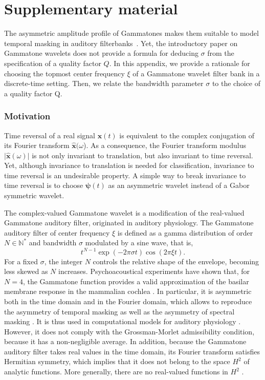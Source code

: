 \documentclass[smallextended]{svjour3}
\begin{document}
\section{Supplementary material}

The asymmetric amplitude profile of Gammatones makes them suitable to model temporal masking in auditory filterbanks~\cite{Fastl2007}.
Yet, the introductory paper on Gammatone wavelets \cite{Venkitaraman2014} does not provide a formula for deducing $\sigma$ from the specification of a quality factor $Q$.
In this appendix, we provide a rationale for choosing the topmost center frequency $\xi$ of a Gammatone wavelet filter bank in a discrete-time setting.
Then, we relate the bandwidth parameter $\sigma$ to the choice of a quality factor Q.


\subsubsection*{Motivation}
Time reversal of a real signal $\boldsymbol{x}(t)$ is equivalent
to the complex conjugation of its Fourier transform $\boldsymbol{\widehat{x}}(\omega$).
As a consequence, the Fourier transform modulus $\vert\boldsymbol{\widehat{x}}(\omega)\vert$
is not only invariant to translation, but also invariant to time reversal.
Yet, although invariance to translation is needed for classification,
invariance to time reversal is an undesirable property.
A simple way to break invariance to time reversal is to choose $\boldsymbol{\psi}(t)$
as an asymmetric wavelet instead of a Gabor symmetric wavelet.

The complex-valued Gammatone wavelet is a modification of the real-valued
Gammatone auditory filter, originated in auditory physiology. The
Gammatone auditory filter of center frequency $\xi$ is defined
as a gamma distribution of order $N\in\mathbb{N}^{*}$ and bandwidth
$\sigma$ modulated by a sine wave, that is,
\[
t^{N-1}\exp(-2\pi\sigma t)\cos(2\pi \xi t).
\]
For a fixed $\sigma$, the integer $N$ controls the relative shape
of the envelope, becoming less skewed as $N$ increases. Psychoacoustical
experiments have shown that, for $N=4$, the Gammatone function provides
a valid approximation of the basilar membrane response in the mammalian
cochlea \cite{Flanagan1960,Patterson1976,Lyon2010}. In particular,
it is asymmetric both in the time domain and in the Fourier domain,
which allows to reproduce the asymmetry of temporal masking as well
as the asymmetry of spectral masking \cite{Fastl2007}. It is thus
used in computational models for auditory physiology \cite{Pressnitzer2005}.
However, it does not comply with the Grossman-Morlet admissibility
condition, because it has a non-negligible average. In addition, because
the Gammatone auditory filter takes real values in the time domain,
its Fourier transform satisfies Hermitian symmetry, which implies
that it does not belong to the space $H^{2}$ of analytic functions.
More generally, there are no real-valued functions in $H^{2}$ \cite{Grossmann1984}.
\end{document}
